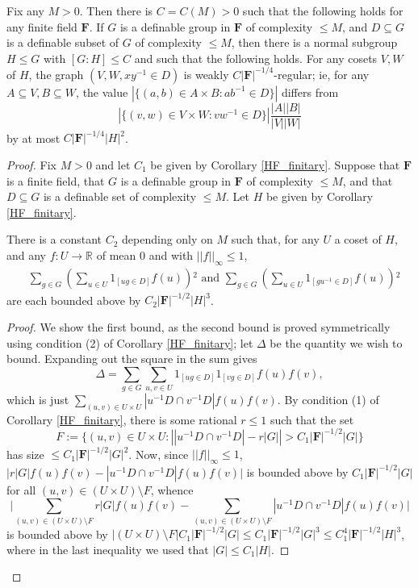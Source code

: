 \documentclass[10pt]{article}
\begin{document}
{ 
\begin{lemma}\label{algebraic_regularity_lemma}
    Fix any $M>0$. Then there is $C=C(M)>0$ such that the following holds for any finite field $\mathbf{F}$. If $G$ is a definable group in $\mathbf{F}$ of complexity $\leqslant M$, and $D\subseteq G$ is a definable subset of $G$ of complexity $\leqslant M$, then there is a normal subgroup $H\leqslant G$ with $[G:H]\leqslant C$ and such that the following holds. For any cosets $V,W$ of $H$, the graph $(V,W,xy^{-1}\in D)$ is weakly $C|\mathbf{F}|^{-1/4}$-regular; ie, for any $A\subseteq V,B\subseteq W$, the value $|\{(a,b)\in A\times B:ab^{-1}\in D\}|$ differs from $$|\{(v,w)\in V\times W:vw^{-1}\in D\}|\frac{|A||B|}{|V||W|}$$ by at most $C|\mathbf{F}|^{-1/4}|H|^2$.
\end{lemma}
\begin{proof}
    Fix $M>0$ and let $C_1$ be given by Corollary \ref{HF_finitary}. Suppose that $\mathbf{F}$ is a finite field, that $G$ is a definable group in $\mathbf{F}$ of complexity $\leqslant M$, and that $D\subseteq G$ is a definable set of complexity $\leqslant M$. Let $H$ be given by Corollary \ref{HF_finitary}.

\begin{claim}\label{mean_0_individual}
    There is a constant $C_2$ depending only on $M$ such that, for any $U$ a coset of $H$, and any $f:U\to\mathbb{R}$ of mean $0$ and with $||f||_\infty\leqslant 1$,
    \begin{align*}
        &\sum_{g\in G}\left(\sum_{u\in U}1_{[ug\in D]}f(u)\right){}^2\text{ and }\sum_{g\in G}\left(\sum_{u\in U}1_{[gu^{-1}\in D]}f(u)\right){}^2
    \end{align*}are each bounded above by $C_2|\mathbf{F}|^{-1/2}|H|^3$.
\end{claim}
\begin{proof}
    We show the first bound, as the second bound is proved symmetrically using condition (2) of Corollary \ref{HF_finitary}; let $\Delta$ be the quantity we wish to bound. Expanding out the square in the sum gives $$\Delta=\sum_{g\in G}\sum_{u,v\in U}1_{[ug\in D]}1_{[vg\in D]}f(u)f(v),$$ which is just $\sum_{(u,v)\in U\times U}|u^{-1}D\cap v^{-1}D|f(u)f(v)$. By condition (1) of Corollary \ref{HF_finitary}, there is some rational $r\leqslant 1$ such that the set $$F:=\{(u,v)\in U\times U:\left||u^{-1}D\cap v^{-1}D|-r|G|\right|>C_1|\mathbf{F}|^{-1/2}|G|\}$$ has size $\leqslant C_1|\mathbf{F}|^{-1/2}|G|^2$. Now, since $||f||_\infty\leqslant 1$, $\big|r|G|f(u)f(v)-|u^{-1}D\cap v^{-1}D|f(u)f(v)\big|$ is bounded above by $C_1|\mathbf{F}|^{-1/2}|G|$ for all $(u,v)\in (U\times U)\setminus F$, whence $$\bigg|\sum_{(u,v)\in (U\times U)\setminus F}r|G|f(u)f(v)-\sum_{(u,v)\in (U\times U)\setminus F}|u^{-1}D\cap v^{-1}D|f(u)f(v)\bigg|$$ is bounded above by $|(U\times U)\setminus F|C_1|\mathbf{F}|^{-1/2}|G|\leqslant C_1|\mathbf{F}|^{-1/2}|G|^3\leqslant C_1^4|\mathbf{F}|^{-1/2}|H|^3$, where in the last inequality we used that $|G|\leqslant C_1|H|$.
    

\end{proof}
\end{proof}}
\end{document}
